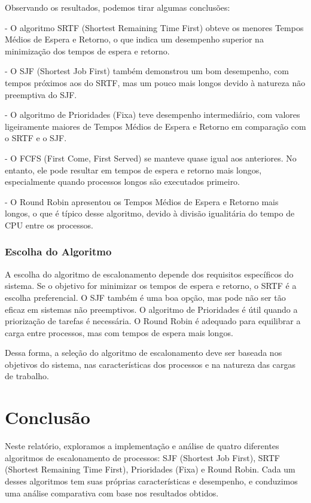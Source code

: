 \documentclass[
	12pt,				%
	openright,			%
	oneside,			%
	a4paper,			%
	chapter=TITLE,		%
	english,			%
	french,				%
	spanish,			%
	brazil				%
	]{abntex2}
\theoremstyle{definition}
\begin{document}
Observando os resultados, podemos tirar algumas conclusões:

- O algoritmo SRTF (Shortest Remaining Time First) obteve os menores Tempos Médios de Espera e Retorno, o que indica um desempenho superior na minimização dos tempos de espera e retorno.

- O SJF (Shortest Job First) também demonstrou um bom desempenho, com tempos próximos aos do SRTF, mas um pouco mais longos devido à natureza não preemptiva do SJF.

- O algoritmo de Prioridades (Fixa) teve desempenho intermediário, com valores ligeiramente maiores de Tempos Médios de Espera e Retorno em comparação com o SRTF e o SJF.

- O FCFS (First Come, First Served) se manteve quase igual aos anteriores. No entanto, ele pode resultar em tempos de espera e retorno mais longos, especialmente quando processos longos são executados primeiro.

- O Round Robin apresentou os Tempos Médios de Espera e Retorno mais longos, o que é típico desse algoritmo, devido à divisão igualitária do tempo de CPU entre os processos.

\subsection{Escolha do Algoritmo}

A escolha do algoritmo de escalonamento depende dos requisitos específicos do 
sistema. Se o objetivo for minimizar os tempos de espera e retorno, o SRTF é 
a escolha preferencial. O SJF também é uma boa opção, mas pode não ser tão 
eficaz em sistemas não preemptivos. O algoritmo de Prioridades é útil quando 
a priorização de tarefas é necessária. O Round Robin é adequado para equilibrar 
a carga entre processos, mas com tempos de espera mais longos.

Dessa forma, a seleção do algoritmo de escalonamento deve ser baseada nos 
objetivos do sistema, nas características dos processos e na natureza das 
cargas de trabalho.
    

\chapter{Conclusão}
\label{conclusao}

Neste relatório, exploramos a implementação e análise de quatro diferentes algoritmos de escalonamento de processos: SJF (Shortest Job First), SRTF (Shortest Remaining Time First), Prioridades (Fixa) e Round Robin. Cada um desses algoritmos tem suas próprias características e desempenho, e conduzimos uma análise comparativa com base nos resultados obtidos.
\end{document}
